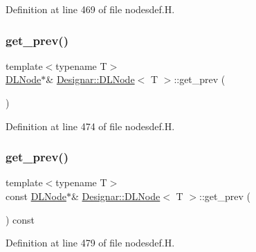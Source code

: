 Definition at line 469 of file nodesdef.\+H.

\mbox{\label{class_designar_1_1_d_l_node_a17271ebf6fc77a191c1a4a9c70fdb702}} 
\subsubsection{\texorpdfstring{get\+\_\+prev()}{get\_prev()}\hspace{0.1cm}{\footnotesize\ttfamily [1/2]}}
{\footnotesize\ttfamily template$<$typename T$>$ \\
\hyperlink{class_designar_1_1_d_l_node}{D\+L\+Node}$\ast$\& \hyperlink{class_designar_1_1_d_l_node}{Designar\+::\+D\+L\+Node}$<$ T $>$\+::get\+\_\+prev (\begin{DoxyParamCaption}{ }\end{DoxyParamCaption})\hspace{0.3cm}{\ttfamily [inline]}}



Definition at line 474 of file nodesdef.\+H.

\mbox{\label{class_designar_1_1_d_l_node_ad994f44ae1d1f56a318796d763361372}} 
\subsubsection{\texorpdfstring{get\+\_\+prev()}{get\_prev()}\hspace{0.1cm}{\footnotesize\ttfamily [2/2]}}
{\footnotesize\ttfamily template$<$typename T$>$ \\
const \hyperlink{class_designar_1_1_d_l_node}{D\+L\+Node}$\ast$\& \hyperlink{class_designar_1_1_d_l_node}{Designar\+::\+D\+L\+Node}$<$ T $>$\+::get\+\_\+prev (\begin{DoxyParamCaption}{ }\end{DoxyParamCaption}) const\hspace{0.3cm}{\ttfamily [inline]}}



Definition at line 479 of file nodesdef.\+H.

